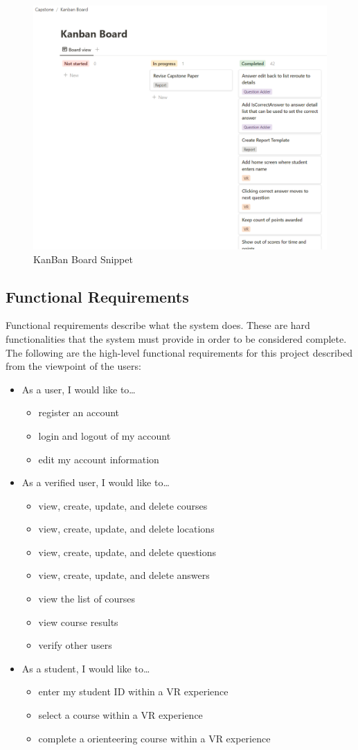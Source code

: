 \begin{figure}[htb]
	\centering
	\includegraphics[width=.6\textwidth]{Requirements/assets/KanBan-Board.png}
	\caption[KanBan Board Snippet]{\label{KanBan}KanBan Board Snippet}
\end{figure} \clearpage

\subsection{Functional Requirements}
Functional requirements describe what the system does. These are hard functionalities that the system must provide in order to be considered complete. The following are the high-level functional requirements for this project described from the viewpoint of the users:
\begin{itemize}
	\item As a user, I would like to\ldots
	\begin{itemize}
		\item register an account
		\item login and logout of my account
		\item edit my account information
	\end{itemize}
	\item As a verified user, I would like to\ldots
	\begin{itemize}
		\item view, create, update, and delete courses
		\item view, create, update, and delete locations
		\item view, create, update, and delete questions
		\item view, create, update, and delete answers
		\item view the list of courses
		\item view course results
		\item verify other users
	\end{itemize}
	\item As a student, I would like to\ldots
	\begin{itemize}
		\item enter my student ID  within a VR experience
		\item select a course within a VR experience
		\item complete a orienteering course within a VR experience
	\end{itemize}
\end{itemize}

